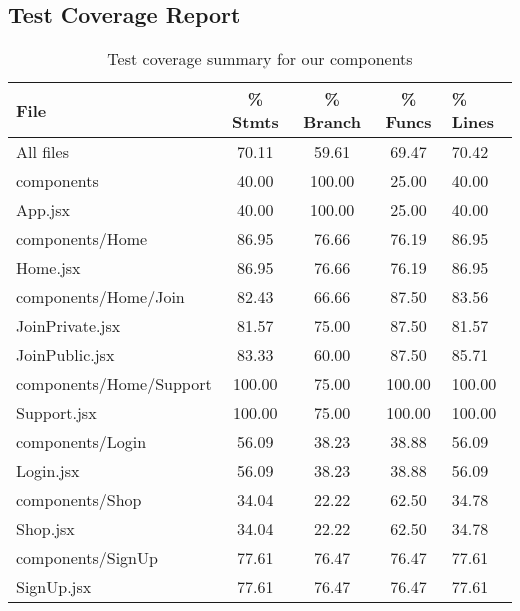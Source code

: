 \subsection{Test Coverage Report}

\begin{table}[H]
\centering
\begin{tabular}{|l|c|c|c|l|}
\hline
\textbf{File} & \textbf{\% Stmts} & \textbf{\% Branch} & \textbf{\% Funcs} & \textbf{\% Lines} \\ \hline
All files                & 70.11  & 59.61  & 69.47  & 70.42 \\ \hline
components               & 40.00  & 100.00 & 25.00  & 40.00 \\ \hline
\hspace{1em}App.jsx      & 40.00  & 100.00 & 25.00  & 40.00 \\ \hline
components/Home          & 86.95  & 76.66  & 76.19  & 86.95 \\ \hline
\hspace{1em}Home.jsx     & 86.95  & 76.66  & 76.19  & 86.95 \\ \hline
components/Home/Join     & 82.43  & 66.66  & 87.50  & 83.56  \\ \hline
\hspace{1em}JoinPrivate.jsx & 81.57  & 75.00  & 87.50  & 81.57 \\ \hline
\hspace{1em}JoinPublic.jsx  & 83.33  & 60.00  & 87.50  & 85.71 \\ \hline
components/Home/Support  & 100.00 & 75.00  & 100.00 & 100.00 \\ \hline
\hspace{1em}Support.jsx  & 100.00 & 75.00  & 100.00 & 100.00 \\ \hline
components/Login         & 56.09  & 38.23  & 38.88  & 56.09 \\ \hline
\hspace{1em}Login.jsx    & 56.09  & 38.23  & 38.88  & 56.09 \\ \hline
components/Shop          & 34.04  & 22.22  & 62.50  & 34.78 \\ \hline
\hspace{1em}Shop.jsx     & 34.04  & 22.22  & 62.50  & 34.78 \\ \hline
components/SignUp        & 77.61  & 76.47  & 76.47  & 77.61 \\ \hline
\hspace{1em}SignUp.jsx   & 77.61  & 76.47  & 76.47  & 77.61 \\ \hline
\end{tabular}
\caption{Test coverage summary for our components}
\label{table:test-coverage}
\end{table}

